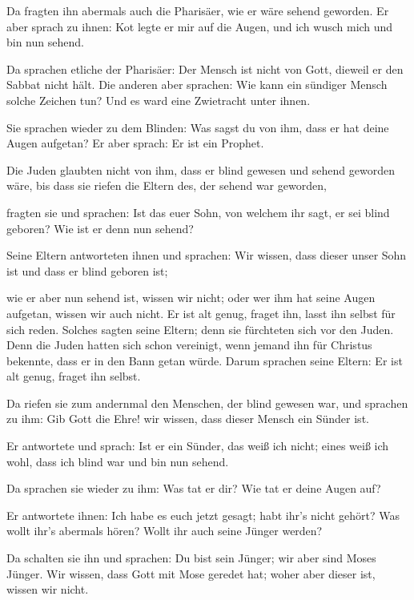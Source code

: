  Da fragten ihn abermals auch die Pharisäer, wie er wäre
sehend geworden. Er aber sprach zu ihnen: Kot legte er mir auf die
Augen, und ich wusch mich und bin nun sehend.

 Da sprachen etliche der Pharisäer: Der Mensch ist nicht
von Gott, dieweil er den Sabbat nicht hält. Die anderen aber sprachen:
Wie kann ein sündiger Mensch solche Zeichen tun? Und es ward eine
Zwietracht unter ihnen.

 Sie sprachen wieder zu dem Blinden: Was sagst du von
ihm, dass er hat deine Augen aufgetan? Er aber sprach: Er ist ein
Prophet.

 Die Juden glaubten nicht von ihm, dass er blind gewesen
und sehend geworden wäre, bis dass sie riefen die Eltern des, der sehend
war geworden,

 fragten sie und sprachen: Ist das euer Sohn, von welchem
ihr sagt, er sei blind geboren? Wie ist er denn nun sehend?

 Seine Eltern antworteten ihnen und sprachen: Wir wissen,
dass dieser unser Sohn ist und dass er blind geboren ist;

 wie er aber nun sehend ist, wissen wir nicht; oder wer
ihm hat seine Augen aufgetan, wissen wir auch nicht. Er ist alt genug,
fraget ihn, lasst ihn selbst für sich reden.  Solches
sagten seine Eltern; denn sie fürchteten sich vor den Juden. Denn die
Juden hatten sich schon vereinigt, wenn jemand ihn für Christus
bekennte, dass er in den Bann getan würde.  Darum
sprachen seine Eltern: Er ist alt genug, fraget ihn selbst.

 Da riefen sie zum andernmal den Menschen, der blind
gewesen war, und sprachen zu ihm: Gib Gott die Ehre! wir wissen, dass
dieser Mensch ein Sünder ist.

 Er antwortete und sprach: Ist er ein Sünder, das weiß
ich nicht; eines weiß ich wohl, dass ich blind war und bin nun sehend.

 Da sprachen sie wieder zu ihm: Was tat er dir? Wie tat
er deine Augen auf?

 Er antwortete ihnen: Ich habe es euch jetzt gesagt; habt
ihr's nicht gehört? Was wollt ihr's abermals hören? Wollt ihr auch seine
Jünger werden?

 Da schalten sie ihn und sprachen: Du bist sein Jünger;
wir aber sind Moses Jünger.  Wir wissen, dass Gott mit
Mose geredet hat; woher aber dieser ist, wissen wir nicht.

